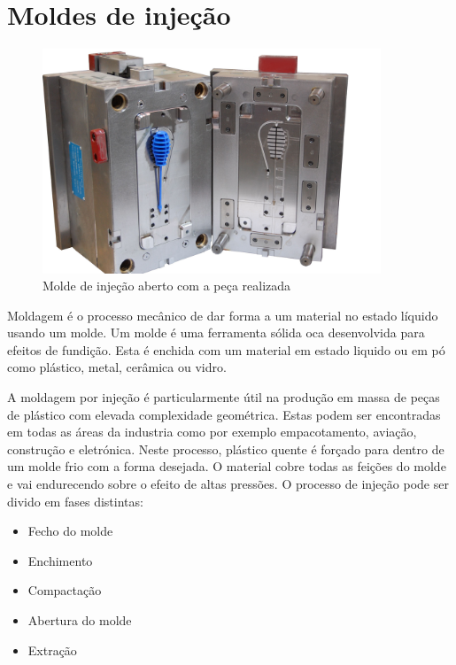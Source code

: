 \documentclass[11pt,twoside,a4paper]{report}
\begin{document}
\section{Moldes de injeção}
\begin{figure}[H]
	\begin{center}
		\includegraphics[width=0.9\textwidth]{molde} %
		\caption{Molde de injeção aberto com a peça realizada\cite{molde_imagem}}
		\label{fig:molde}
	\end{center}
\end{figure}
Moldagem é o processo mecânico de dar forma a um material no estado líquido usando um molde\cite{definicao_moldagem,definicao_moldar}. Um molde é uma ferramenta sólida oca desenvolvida para efeitos de fundição\cite{definicao_molde}. Esta é enchida com um material em estado liquido ou em pó como plástico, metal, cerâmica ou vidro\cite{Williams1975,Trovant1998,JanneyMarkA.Knoxville1991,Yan2009}.\par
A moldagem por injeção é particularmente útil na produção em massa de peças de plástico com elevada complexidade geométrica\cite{Shen,Shelesh}. Estas podem ser encontradas em todas as áreas da industria como por exemplo empacotamento, aviação, construção e eletrónica\cite{Ozcelik}. Neste processo, plástico quente é forçado para dentro de um molde frio com a forma desejada. O material cobre todas as feições do molde e vai endurecendo sobre o efeito de altas pressões. O processo de injeção pode ser divido em fases distintas\cite{Shen}:
\begin{itemize}[noitemsep]
	\item Fecho do molde
	\item Enchimento
	\item Compactação
	\item Abertura do molde
	\item Extração
\end{itemize}
\end{document}
